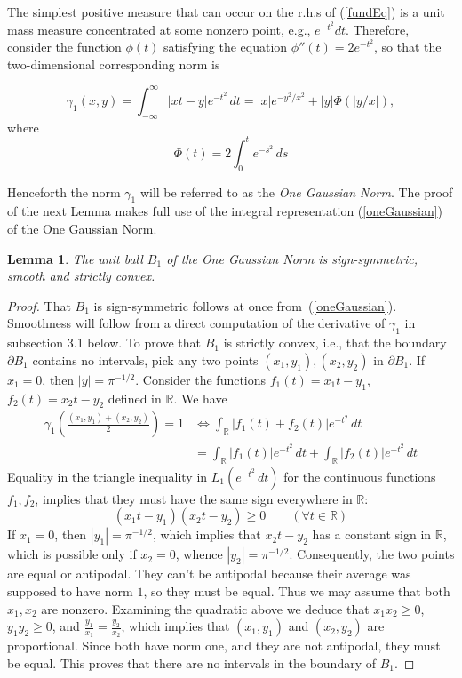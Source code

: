 \documentclass{article}[1100]
\newtheorem{lemma}[theorem]{Lemma}
\theoremstyle{definition}
\theoremstyle{remark}
\newcommand\ar{\mathbb{R}}
\newcommand\norma[1]{|\!|#1|\!|}
\begin{document}
The simplest positive measure that can occur on the r.h.s of (\ref{fundEq}) is a unit mass measure concentrated at some nonzero point, e.g., $e^{-t^2}dt$.  Therefore, 
consider the  function $\phi(t)$ satisfying the equation $\phi''(t)=2e^{-t^2}$, so that the two-dimensional corresponding norm is
\begin{tcolorbox}

\begin{equation}\label{oneGaussian}
\gamma_1(x,y)=\int_{-\infty}^{\infty}|xt-y|e^{-t^2}\,dt=|x|e^{-y^2/x^2}+|y|\Phi(|y/x|),
\end{equation}
where
\[ \Phi(t)=2\int_{0}^te^{-s^2}\,ds \]
\end{tcolorbox}
Henceforth the norm $\gamma_1$ will be referred to as the \emph{One Gaussian Norm}.
The proof of the next Lemma makes full use of the integral representation (\ref{oneGaussian}) of the One Gaussian Norm.
\begin{tcolorbox}
\begin{lemma}\label{strictlyConvexAndSmooth}
The unit ball $B_1$ of the One Gaussian Norm is sign-symmetric, smooth and strictly convex.
\end{lemma}
\end{tcolorbox}
\begin{proof}
That $B_1$ is sign-symmetric follows at once from~(\ref{oneGaussian}).  Smoothness will follow from a direct computation of the derivative of $\gamma_1$ in subsection 3.1 below. To prove that $B_1$ is strictly convex, i.e., that the boundary $\partial B_1$ contains no intervals, pick any two  points $(x_1,y_1),(x_2,y_2)$ in $\partial B_1$. 
If $x_1=0$, then $|y|=\pi^{-1/2}$.
Consider the functions $f_1(t)=x_1t-y_1$, $f_2(t)=x_2t-y_2$ defined in $\ar$. We have 
\[ 
\begin{aligned}
\gamma_1(\frac{(x_1,y_1)+(x_2,y_2)}{2})=1&\Longleftrightarrow \int_\ar |f_1(t)+f_2(t)|e^{-t^2}\,dt\\
&=\int_\ar |f_1(t)|e^{-t^2}\,dt+\int_\ar |f_2(t)|e^{-t^2}\,dt 
\end{aligned}
\]
Equality in the triangle inequality in $L_1(e^{-t^2}\,dt)$ for the continuous functions $f_1,f_2$, implies that they must have the same sign everywhere in $\ar$:
\[ (x_1t-y_1)(x_2t-y_2)\geq 0\qquad (\forall t\in\ar) \]
If $x_1=0$, then $|y_1|=\pi^{-1/2}$, which implies that $x_2t-y_2$ has a constant sign in $\ar$, which is possible only if $x_2=0$, whence $|y_2|=\pi^{-1/2}$. Consequently,
the two points are equal or antipodal. They can't be antipodal because their average was supposed to have norm $1$, so they must be equal. Thus we may assume that both $x_1,x_2$ are nonzero. Examining the  quadratic above we deduce that $x_1x_2\geq 0$, $y_1y_2\geq 0$, and  $\frac{y_1}{x_1}=\frac{y_2}{x_2}$, which implies that $(x_1,y_1)$ and $(x_2,y_2)$ are proportional. Since both have norm one, and they are not antipodal, they must be equal. This proves that there are no intervals in the boundary of $B_1$.
\end{proof}
\end{document}
